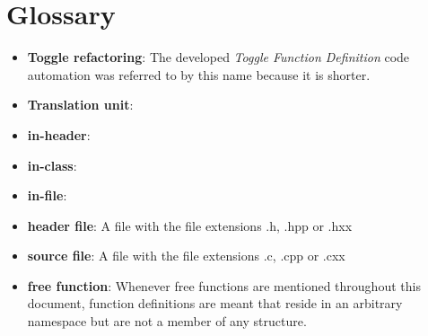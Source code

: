 \chapter{Glossary}
\thispagestyle{fancy}

\begin{itemize}
\item \textbf{Toggle refactoring}: The developed \textit{Toggle Function Definition} code automation was referred to by this name because it is shorter.
\item \textbf{Translation unit}:
\item \textbf{in-header}:
\item \textbf{in-class}:
\item \textbf{in-file}:
\item \textbf{header file}: A file with the file extensions .h, .hpp or .hxx
\item \textbf{source file}: A file with the file extensions .c, .cpp or .cxx
\item \textbf{free function}: Whenever free functions are mentioned throughout this document, function definitions are meant that reside in an arbitrary namespace but are not a member of any structure.
\end{itemize}

